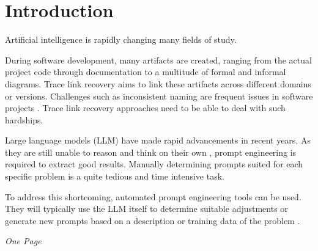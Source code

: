 
\chapter{Introduction}
\label{ch:Introduction}

Artificial intelligence is rapidly changing many fields of study.

During software development, many artifacts are created, ranging from the actual project code through documentation to a multitude of formal and informal diagrams. Trace link recovery aims to link these artifacts across different domains or versions. Challenges such as inconsistent naming are frequent issues in software projects \cite{wohlrab2019ImprovingConsistency}. Trace link recovery approaches need to be able to deal with such hardships. 

Large language models (LLM) have made rapid advancements in recent years. As they are still unable to reason and think on their own \cite{shojaee2025IllusionThinking}, prompt engineering is required to extract good results. Manually determining prompts suited for each specific problem is a quite tedious and time intensive task. 

To address this shortcoming, automated prompt engineering tools can be used. They will typically use the LLM itself to determine suitable adjustments or generate new prompts based on a description or training data of the problem \cite{}.

\textit{One Page}